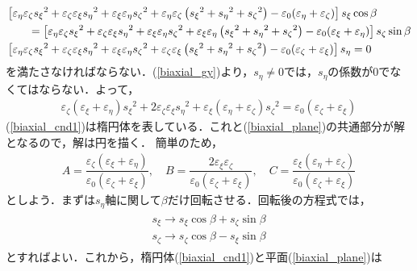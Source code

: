 \begin{align}
  &\left[\varepsilon_\eta\varepsilon_\zeta{s_\xi}^2+\varepsilon_\zeta\varepsilon_\xi{s_\eta}^2+\varepsilon_\xi\varepsilon_\eta{s_\zeta}^2+\varepsilon_\eta\varepsilon_\zeta\left({s_\xi}^2+{s_\eta}^2+{s_\zeta}^2\right)-\varepsilon_0(\varepsilon_\eta+\varepsilon_\zeta)\right]s_\xi\cos\beta\notag\\
  &\qquad=\left[\varepsilon_\eta\varepsilon_\zeta{s_\xi}^2+\varepsilon_\zeta\varepsilon_\xi{s_\eta}^2+\varepsilon_\xi\varepsilon_\eta{s_\zeta}^2+\varepsilon_\xi\varepsilon_\eta\left({s_\xi}^2+{s_\eta}^2+{s_\zeta}^2\right)-\varepsilon_0(\varepsilon_\xi+\varepsilon_\eta)\right]s_\zeta\sin\beta\label{biaxial_gxz}\\
  &\left[\varepsilon_\eta\varepsilon_\zeta{s_\xi}^2+\varepsilon_\zeta\varepsilon_\xi{s_\eta}^2+\varepsilon_\xi\varepsilon_\eta{s_\zeta}^2+\varepsilon_\zeta\varepsilon_\xi\left({s_\xi}^2+{s_\eta}^2+{s_\zeta}^2\right)-\varepsilon_0(\varepsilon_\zeta+\varepsilon_\xi)\right]s_\eta=0\label{biaxial_gy}
\end{align}
を満たさなければならない．(\ref{biaxial_gy})より，$s_\eta\neq0$では，$s_\eta$の係数が0でなくてはならない．よって，
\begin{align}
  \varepsilon_\zeta(\varepsilon_\xi+\varepsilon_\eta){s_\xi}^2+2\varepsilon_\zeta\varepsilon_\xi{s_\eta}^2+\varepsilon_\xi(\varepsilon_\eta+\varepsilon_\zeta){s_\zeta}^2=\varepsilon_0(\varepsilon_\zeta+\varepsilon_\xi)\label{biaxial_cnd1}
\end{align}
(\ref{biaxial_cnd1})は楕円体を表している．これと(\ref{biaxial_plane})の共通部分が解となるので，解は円を描く．
簡単のため，
\begin{align}
  A=\dfrac{\varepsilon_\zeta(\varepsilon_\xi+\varepsilon_\eta)}{\varepsilon_0(\varepsilon_\zeta+\varepsilon_\xi)},\quad
  B=\dfrac{2\varepsilon_\xi\varepsilon_\zeta}{\varepsilon_0(\varepsilon_\zeta+\varepsilon_\xi)},\quad
  C=\dfrac{\varepsilon_\xi(\varepsilon_\eta+\varepsilon_\zeta)}{\varepsilon_0(\varepsilon_\zeta+\varepsilon_\xi)}\label{biaxial_ABC}
\end{align}
としよう．まずは$s_\eta$軸に関して$\beta$だけ回転させる．回転後の方程式では，
\begin{align}
  \begin{split}
    s_\xi\to{}s_\xi\cos\beta+s_\zeta\sin\beta\\
    s_\zeta\to{}s_\zeta\cos\beta-s_\xi\sin\beta
  \end{split}
\end{align}
とすればよい．これから，楕円体(\ref{biaxial_cnd1})と平面(\ref{biaxial_plane})は

